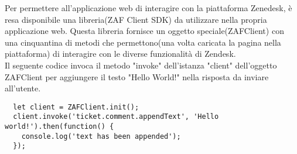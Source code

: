 Per permettere all'applicazione web di interagire con la piattaforma Zenedesk, è resa disponibile una libreria(ZAF Client SDK) da utilizzare nella propria applicazione web. Questa libreria fornisce un oggetto speciale(ZAFClient) con una cinquantina di metodi che permettono(una volta caricata la pagina nella piattaforma) di interagire con le diverse funzionalità di Zendesk.
\\
 
Il seguente codice invoca il metodo "invoke" dell'istanza "client" dell'oggetto ZAFClient per aggiungere il testo "Hello World!" nella risposta da inviare all'utente.  
\\
\begin{lstlisting}
  let client = ZAFClient.init();
  client.invoke('ticket.comment.appendText', 'Hello world!').then(function() {
	console.log('text has been appended');
  });
\end{lstlisting} 